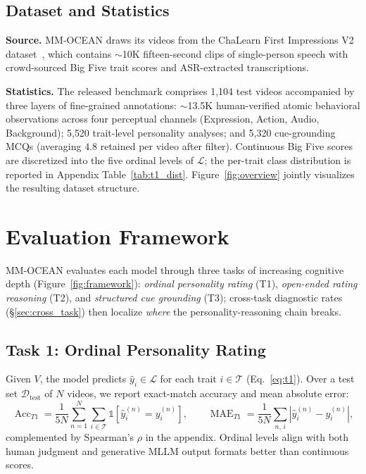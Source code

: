 \documentclass{llmxive}
\providecommand{\benchname}{MM-OCEAN}
\begin{document}
\vspace{-0.2cm}
\subsection{Dataset and Statistics}
\label{sec:data}
\vspace{-0.2cm}
\noindent\textbf{Source.}
\benchname{} draws its videos from the ChaLearn First Impressions V2 dataset~\cite{escalante2020modeling}, which contains $\sim$10K fifteen-second clips of single-person speech with crowd-sourced Big Five trait scores and ASR-extracted transcriptions. 

\noindent\textbf{Statistics.}
\label{sec:stats}
The released benchmark comprises 1{,}104 test videos accompanied by three layers of fine-grained annotations: $\sim$13.5K human-verified atomic behavioral observations 
across four perceptual channels (Expression, Action, Audio, Background); 5{,}520 trait-level personality analyses;
and 5{,}320 cue-grounding MCQs (averaging $4.8$ retained per video after filter). Continuous Big Five scores are discretized into the five ordinal levels of $\mathcal{L}$; the per-trait class distribution is reported in Appendix Table~\ref{tab:t1_dist}. Figure~\ref{fig:overview} jointly visualizes the resulting dataset structure.

\section{Evaluation Framework}
\label{sec:eval}

\benchname{} evaluates each model through three tasks of increasing cognitive depth (Figure~\ref{fig:framework}): \emph{ordinal personality rating} (T1), \emph{open-ended rating reasoning} (T2), and \emph{structured cue grounding} (T3); cross-task diagnostic rates (\S\ref{sec:cross_task}) then localize \emph{where} the personality-reasoning chain breaks.

\subsection{Task 1: Ordinal Personality Rating}
\label{sec:task1}
Given $V$, the model predicts $\hat{y}_i \in \mathcal{L}$ for each trait $i\!\in\!\mathcal{T}$ (Eq.~\ref{eq:t1}). Over a test set $\mathcal{D}_{\text{test}}$ of $N$ videos, we report exact-match accuracy and mean absolute error:
\begin{equation}
\operatorname{Acc}_{T1} = \frac{1}{5N}\sum_{n=1}^{N}\sum_{i\in\mathcal{T}} \mathbb{1}\!\left[\hat{y}_i^{(n)} = y_i^{(n)}\right],
\qquad
\operatorname{MAE}_{T1} = \frac{1}{5N}\sum_{n,\,i} \left|\hat{y}_i^{(n)} - y_i^{(n)}\right|,
\label{eq:t1_metrics}
\end{equation}
complemented by Spearman's $\rho$ in the appendix. Ordinal levels align with both human judgment and generative MLLM output formats better than continuous scores.
\end{document}
